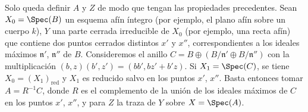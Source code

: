 \begin{remark}[20.2.16]
Solo queda definir $A$ y $Z$ de modo que tengan las propiedades precedentes.
Sean $X_0=\Spec(B)$ un esquema afín íntegro (por ejemplo, el plano afín sobre un cuerpo $k$), $Y$ una parte cerrada irreducible de $X_0$ (por ejemplo, una recta afín) que contiene dos puntos cerrados distintos $x'$ y $x''$, correspondientes a los ideales máximos $\mathfrak{n}'$, $\mathfrak{n}''$ de $B$.
Consideremos el anillo $C=B\oplus(B/\mathfrak{n}'\oplus B/\mathfrak{n}'')$ con la multiplicación $(b,z)(b',z')=(bb',bz'+b'z)$.
Si $X_1=\Spec(C)$, se tiene $X_0=(X_1)_\mathrm{red}$ y $X_1$ es reducido salvo en los puntos $x'$, $x''$.
Basta entonces tomar $A=R^{-1}C$, donde $R$ es el complemento de la unión de los ideales máximos de $C$ en los puntos $x'$, $x''$, y para $Z$ la traza de $Y$ sobre $X=\Spec(A)$.
\end{remark}
